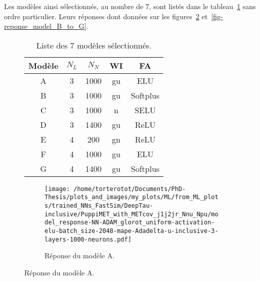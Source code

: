Les modèles ainsi sélectionnés, au nombre de 7, sont listés dans le tableau~\ref{tab-chapter-ML-section-hyperparameters-others-final} sans ordre particulier.
Leurs réponses dont données sur les figures~\ref{subfig-reponse_model_A} et~\ref{fig-reponse_model_B_to_G}.
\begin{figure}[h]
\centering
\begin{minipage}[c]{.45\textwidth}
\begin{table}[H]
\centering
\begin{tabular}{ccccc}
\toprule
Modèle & $N_L$ & $N_N$ & WI & FA \\
\midrule
A & 3 & \num{1000} & gu & ELU \\
B & 3 & \num{1000} & gu & Softplus \\
C & 3 & \num{1000} & n & SELU \\
D & 3 & \num{1400} & gu & ReLU \\
E & 4 & \num{200} & gn & ReLU \\
F & 4 & \num{1000} & gu & ELU \\
G & 4 & \num{1400} & gu & Softplus \\
\bottomrule
\end{tabular}
\caption{Liste des 7 modèles sélectionnés.}
\label{tab-chapter-ML-section-hyperparameters-others-final}
\end{table}
\end{minipage}
\hfill
\begin{minipage}[c]{.45\textwidth}
\begin{figure}[H]
\texttt{[image: /home/torterotot/Documents/PhD-Thesis/plots\_and\_images/my\_plots/ML/from\_ML\_plots/trained\_NNs\_FastSim/DeepTau-inclusive/PuppiMET\_with\_METcov\_j1j2jr\_Nnu\_Npu/model\_response-NN-ADAM\_glorot\_uniform-activation-elu-batch\_size-2048-mape-Adadelta-u-inclusive-3-layers-1000-neurons.pdf]}

\caption{Réponse du modèle A.}
\label{subfig-reponse_model_A}
\end{figure}
\end{minipage}
\end{figure}
